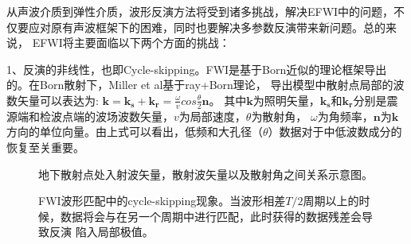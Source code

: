 从声波介质到弹性介质，波形反演方法将受到诸多挑战，解决EFWI中的问题，不仅要应对原有声波框架下的困难，同时也要解决多参数反演带来新问题。总的来说，
EFWI将主要面临以下两个方面的挑战：

1、反演的非线性，也即Cycle-skipping。FWI是基于Born近似的理论框架导出的。在Born散射下，Miller et al\cite{miller:1987}基于ray+Born理论，
导出模型中散射点局部的波数矢量可以表达为:
$    \mathbf{k}=\mathbf{k_s}+\mathbf{k_r}=\frac{\omega}{v}cos\frac{\theta}{2}\mathbf{n}$。
其中$\mathbf{k}$为照明矢量，$\mathbf{k_s}$和$\mathbf{k_r}$分别是震源端和检波点端的波场波数矢量，$v$为局部速度，$\theta$为散射角，
$\omega$为角频率，$\mathbf{n}$为$\mathbf{k}$方向的单位向量。由上式可以看出，低频和大孔径（$\theta$）数据对于中低波数成分的恢复至关重要。
\begin{figure}[!htb] 
   \centering 
   \caption{地下散射点处入射波矢量，散射波矢量以及散射角之间关系示意图。}
   \label{fig:WavenumberVector}
\end{figure}
\begin{figure}[!htb] 
   \centering 
   \caption{FWI波形匹配中的cycle-skipping现象。当波形相差$T/2$周期以上的时候，数据将会与在另一个周期中进行匹配，此时获得的数据残差会导致反演
   陷入局部极值。}
   \label{fig:WavenumberVector}
\end{figure}
